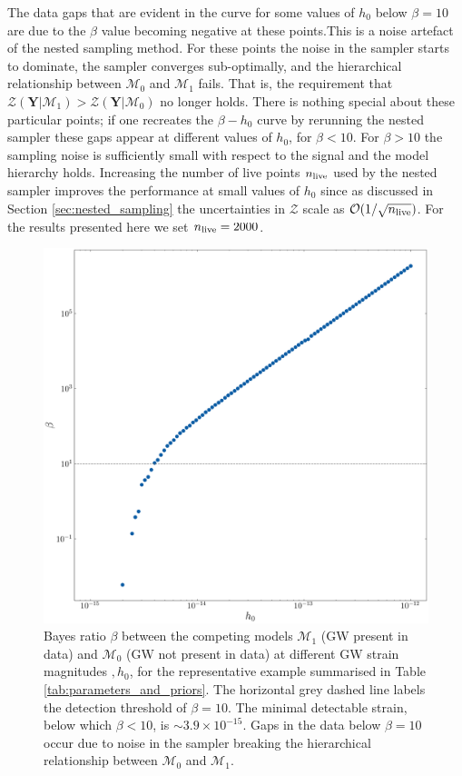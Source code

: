 \documentclass[fleqn,usenatbib,useAMS]{mnras}
\begin{document}
The data gaps that are evident in the curve for some values of $h_0$ below $\beta =10$ are due to the $\beta$ value becoming negative at these points.This is a noise artefact of the nested sampling method. For these points the noise in the sampler starts to dominate, the sampler converges sub-optimally, and the hierarchical relationship between $\mathcal{M}_0$ and  $\mathcal{M}_1$ fails. That is, the requirement that $\mathcal{Z}(\boldsymbol{Y} | \mathcal{M}_1) > \mathcal{Z}(\boldsymbol{Y} | \mathcal{M}_0)$ no longer holds. There is nothing special about these particular points; if one recreates the $\beta - h_0$ curve by rerunning the nested sampler these gaps appear at different values of $h_0$, for $\beta < 10$. For $\beta > 10$ the sampling noise is sufficiently small with respect to the signal and the model hierarchy holds. Increasing the number of live points $n_{\rm live}$ used by the nested sampler improves the performance at small values of $h_0$ since as discussed in Section \ref{sec:nested_sampling} the uncertainties in $\mathcal{Z}$ scale as $\mathcal{O}(1/ \sqrt{n_{\rm live}})$. For the results presented here we set $n_{\rm live} =2000$. 
\begin{figure}
	\includegraphics[width=\columnwidth]{images/CanonicalBayesPlot2000}
	\caption{Bayes ratio $\beta$ between the competing models $\mathcal{M}_1$ (GW present in data) and $\mathcal{M}_0$ (GW not present in data) at different GW strain magnitudes $,h_0$, for the representative example summarised in Table \ref{tab:parameters_and_priors}. The horizontal grey dashed line labels the detection threshold of $\beta = 10$. The minimal detectable strain, below which $\beta < 10$, is $\sim 3.9 \times 10^{-15}$. Gaps in the data below $\beta=10$ occur due to noise in the sampler breaking the hierarchical relationship between $\mathcal{M}_0$ and $\mathcal{M}_1$.}
	\label{fig:bayes}
\end{figure}
\end{document}
